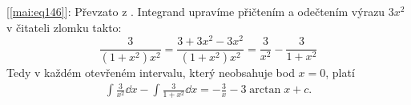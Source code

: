   [\ref{mai:eq146}]: Převzato z \cite[s.~29]{Knichal}. Integrand upravíme přičtením a
  odečtením výrazu $3x^2$ v čitateli zlomku takto:
  \begin{equation*}
    \frac{3}{(1+x^2)x^2} = \frac{3+3x^2-3x^2}{(1+x^2)x^2} = \frac{3}{x^2}-\frac{3}{1+x^2}  
  \end{equation*}
  Tedy v každém otevřeném intervalu, který neobsahuje bod \(x=0\), platí
  \begin{gather*}
    \int{\frac{3}{x^2}\dd{x}} - \int{\frac{3}{1+x^2}\dd{x}} = -\frac{3}{x}-3\arctan x + c. 
  \end{gather*}